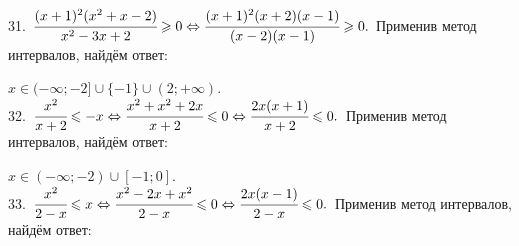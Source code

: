 \documentclass[12pt]{article}
\begin{document}
31. $\cfrac{(x+1)^2(x^2+x-2)}{x^2-3x+2}\geqslant0\Leftrightarrow\cfrac{(x+1)^2(x+2)(x-1)}{(x-2)(x-1)}\geqslant0.$
Применив метод интервалов, найдём ответ:
\begin{figure}[ht!]
\end{figure}
$x\in(-\infty;-2]\cup\{-1\}\cup(2;+\infty).$\\
32. $\cfrac{x^2}{x+2}\leqslant -x\Leftrightarrow\cfrac{x^2+x^2+2x}{x+2}\leqslant 0\Leftrightarrow\cfrac{2x(x+1)}{x+2}\leqslant 0.$
Применив метод интервалов, найдём ответ:
\begin{figure}[ht!]
\end{figure}
$x\in(-\infty;-2)\cup[-1;0].$\\
33. $\cfrac{x^2}{2-x}\leqslant x \Leftrightarrow\cfrac{x^2-2x+x^2}{2-x}\leqslant 0\Leftrightarrow\cfrac{2x(x-1)}{2-x}\leqslant 0.$
Применив метод интервалов, найдём ответ:
\begin{figure}[ht!]
\end{figure}
\end{document}
